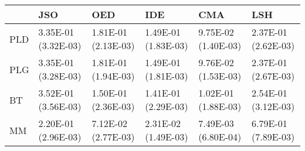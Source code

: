 \begin{tabular}{llllll}
\toprule
{} &                  JSO &                  OED &                  IDE &                  CMA &                  LSH \\
\midrule
PLD &  3.35E-01 (3.32E-03) &  1.81E-01 (2.13E-03) &  1.49E-01 (1.83E-03) &  9.75E-02 (1.40E-03) &  2.37E-01 (2.62E-03) \\
PLG &  3.35E-01 (3.28E-03) &  1.81E-01 (1.94E-03) &  1.49E-01 (1.81E-03) &  9.76E-02 (1.53E-03) &  2.37E-01 (2.67E-03) \\
BT  &  3.52E-01 (3.56E-03) &  1.50E-01 (2.36E-03) &  1.41E-01 (2.29E-03) &  1.02E-01 (1.88E-03) &  2.54E-01 (3.12E-03) \\
MM  &  2.20E-01 (2.96E-03) &  7.12E-02 (2.77E-03) &  2.31E-02 (1.49E-03) &  7.49E-03 (6.80E-04) &  6.79E-01 (7.89E-03) \\
\bottomrule
\end{tabular}
